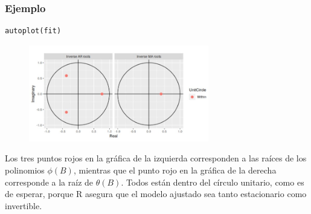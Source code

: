 \documentclass[10pt]{beamer}
\begin{document}
\begin{frame}[fragile]
\frametitle{Ejemplo}


\lstset{language=r,label= ,caption= ,captionpos=b,numbers=none}
\begin{lstlisting}
autoplot(fit)
\end{lstlisting}

\pause


\begin{figure}
\begin{center}
    \includegraphics[width=0.7\textwidth]{Imagen20.JPG}
\end{center}
\end{figure}


\small Los tres puntos rojos en la gráfica de la izquierda corresponden a las raíces de los polinomios $\phi(B)$, mientras que el punto rojo en la gráfica de la derecha corresponde a la raíz de $\theta(B)$. Todos están dentro del círculo unitario, como es de esperar, porque R asegura que el modelo ajustado sea tanto estacionario como invertible.


\end{frame}



















\end{document}
